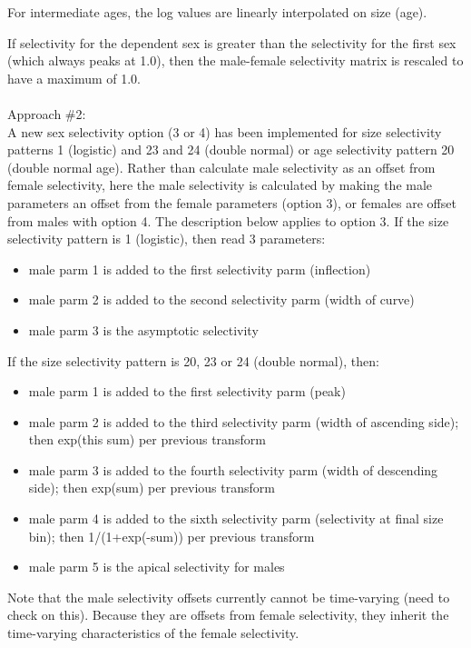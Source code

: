 For intermediate ages, the log values are linearly interpolated on size (age).

If selectivity for the dependent sex is greater than the selectivity for the first sex (which always peaks at 1.0), then the male-female selectivity matrix is rescaled to have a maximum of 1.0.\\
\\
Approach \#2:\\
A new sex selectivity option (3 or 4) has been implemented for size selectivity patterns 1 (logistic) and 23 and 24 (double normal) or age selectivity pattern 20 (double normal age).  Rather than calculate male selectivity as an offset from female selectivity, here the male selectivity is calculated by making the male parameters an offset from the female parameters (option 3), or females are offset from males with option 4.  The description below applies to option 3. If the size selectivity pattern is 1 (logistic), then read 3 parameters:
\begin{itemize}
	\item male parm 1 is added to the first selectivity parm (inflection)
	\item male parm 2 is added to the second selectivity parm (width of curve)
	\item male parm 3 is the asymptotic selectivity
\end{itemize}

If the size selectivity pattern is 20, 23 or 24 (double normal), then:
\begin{itemize}
	\item male parm 1 is added to the first selectivity parm (peak)
	\item male parm 2 is added to the third selectivity parm (width of ascending side); then exp(this sum) per previous transform
	\item male parm 3 is added to the fourth selectivity parm (width of descending side); then exp(sum) per previous transform
	\item male parm 4 is added to the sixth selectivity parm (selectivity at final size bin); then 1/(1+exp(-sum)) per previous transform
	\item male parm 5 is the apical selectivity for males
\end{itemize}

Note that the male selectivity offsets currently cannot be time-varying (need to check on this).  Because they are offsets from female selectivity, they inherit the time-varying characteristics of the female selectivity.


